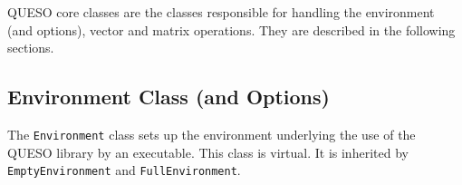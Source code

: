 QUESO core classes are the classes responsible for handling the environment (and options), vector
and matrix operations. They are described in the following sections.

% 
% 
% 
% 
% 
% 


\subsection{Environment Class (and Options)}\label{sec:environment_class}

%
The \texttt{Environment} class sets up the environment underlying the use of the QUESO library by an executable.
This class is virtual. It is inherited by \verb+EmptyEnvironment+ and \verb+FullEnvironment+.

